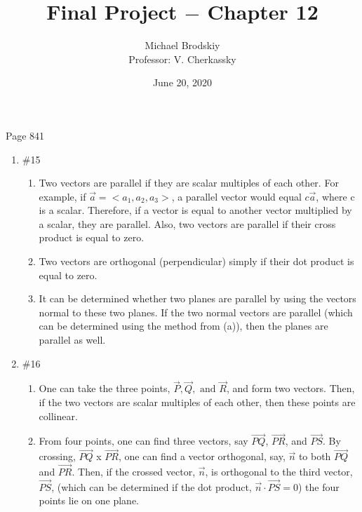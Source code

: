 \documentclass[12pt]{article}
\title{Final Project $-$ Chapter 12}
\date{June 20, 2020}
\author{Michael Brodskiy\\ \small Professor: V. Cherkassky}
\begin{document}
\maketitle

\begin{center}

Page 841

\end{center}

\begin{enumerate}

  \item \#15 \begin{enumerate}

      \item Two vectors are parallel if they are scalar multiples of each other. For example, if $\overrightarrow{a}=<a_1,a_2,a_3>$, a parallel vector would equal $c\overrightarrow{a}$, where c is a scalar. Therefore, if a vector is equal to another vector multiplied by a scalar, they are parallel. Also, two vectors are parallel if their cross product is equal to zero.

     \item Two vectors are orthogonal (perpendicular) simply if their dot product is equal to zero.

     \item It can be determined whether two planes are parallel by using the vectors normal to these two planes. If the two normal vectors are parallel (which can be determined using the method from (a)), then the planes are parallel as well. 

    \end{enumerate}

  \item \#16 \begin{enumerate}

      \item One can take the three points, $\overrightarrow{P}, \overrightarrow{Q}, \text{ and } \overrightarrow{R}$, and form two vectors. Then, if the two vectors are scalar multiples of each other, then these points are collinear.

      \item From four points, one can find three vectors, say $\overrightarrow{PQ}$, $\overrightarrow{PR}$, and $\overrightarrow{PS}$. By crossing, $\overrightarrow{PQ}$ x $\overrightarrow{PR}$, one can find a vector orthogonal, say, $\overrightarrow{n}$ to both $\overrightarrow{PQ}$ and $\overrightarrow{PR}$. Then, if the crossed vector, $\overrightarrow{n}$, is orthogonal to the third vector, $\overrightarrow{PS}$, (which can be determined if the dot product, $\overrightarrow{n}\cdot\overrightarrow{PS}=0$) the four points lie on one plane. 


\end{enumerate}
\end{enumerate}
\end{document}
